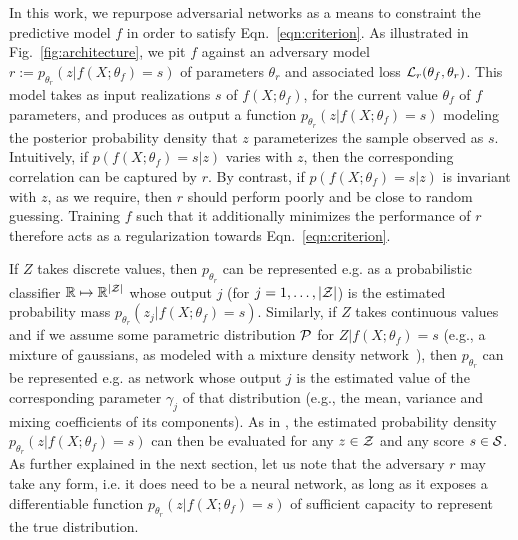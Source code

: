 \documentclass[twocolumn,superscriptaddress,aps]{revtex4-1}
\theoremstyle{plain}
\begin{document}
In this work, we repurpose adversarial networks as a means to constraint the
predictive model $f$ in order to satisfy Eqn.~\ref{eqn:criterion}. As
illustrated in Fig.~\ref{fig:architecture}, we pit $f$ against an adversary
model $r := p_{\theta_r}(z | f(X;\theta_f)=s)$ of parameters $\theta_r$ and
associated loss ${\cal L}_r(\theta_f, \theta_r)$. This model takes  as input
realizations $s$ of $f(X; \theta_f)$, for the current value $\theta_f$ of $f$
parameters, and produces as output a function $p_{\theta_r}(z | f(X;\theta_f)=s)$
modeling the posterior probability density that $z$ parameterizes the sample
observed as $s$.
Intuitively, if $p(f(X; \theta_f)=s|z)$ varies with $z$,
then the corresponding correlation can be captured by $r$. By contrast, if
$p(f(X; \theta_f)=s|z)$ is invariant with $z$, as we require, then $r$ should
perform poorly and be close to random guessing. Training $f$ such that it
additionally minimizes the performance of $r$ therefore acts as a regularization
towards Eqn.~\ref{eqn:criterion}.

If $Z$ takes discrete values, then $p_{\theta_r}$ can be represented e.g. as a
probabilistic classifier $\mathbb{R} \mapsto \mathbb{R}^{|{\cal Z|}}$ whose
output $j$ (for $j=1, \dots, |{\cal Z}|$) is the estimated probability mass
$p_{\theta_r}(z_j|f(X;\theta_f)=s)$. Similarly, if $Z$ takes continuous values and
if we assume some parametric distribution ${\cal P}$ for $Z|f(X;\theta_f)=s$
(e.g., a mixture of gaussians, as modeled with a mixture
density network~\citep{bishop1994mixture}), then $p_{\theta_r}$ can be
represented e.g. as network whose output $j$ is the estimated value of the
corresponding parameter $\gamma_j$ of that distribution (e.g., the mean,
variance and mixing coefficients of its components). As in
\citep{nix1994estimating,bishop1994mixture}, the estimated probability density
$p_{\theta_r}(z|f(X;\theta_f)=s)$ can then be evaluated for any $z \in {\cal Z}$ and any score $s \in {\cal S}$.
As further explained in the next section, let us note that the adversary $r$ may
take any form, i.e. it does need to be a neural network, as long as it exposes a
differentiable function $p_{\theta_r}(z|f(X;\theta_f)=s)$ of sufficient capacity
to represent the true distribution.
\end{document}
